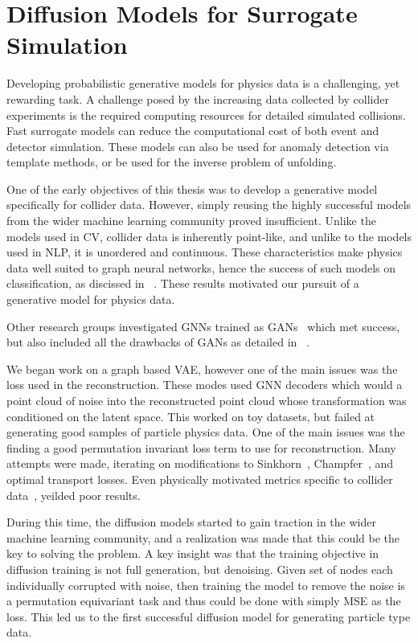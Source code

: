 \chapter{Diffusion Models for Surrogate Simulation}

Developing probabilistic generative models for physics data is a challenging, yet rewarding task.
A challenge posed by the increasing data collected by collider experiments is the required computing resources for detailed simulated collisions.
Fast surrogate models can reduce the computational cost of both event and detector simulation.
These models can also be used for anomaly detection via template methods, or be used for the inverse problem of unfolding.

One of the early objectives of this thesis was to develop a generative model specifically for collider data.
However, simply reusing the highly successful models from the wider machine learning community proved insufficient.
Unlike the models used in CV, collider data is inherently point-like, and unlike to the models used in NLP, it is unordered and continuous.
These characteristics make physics data well suited to graph neural networks, hence the success of such models on classification, as discissed in ~.
These results motivated our pursuit of a generative model for physics data.


Other research groups investigated GNNs trained as GANs~\cite{MPGAN} which met success, but also included all the drawbacks of GANs as detailed in ~.

We began work on a graph based VAE, however one of the main issues was the loss used in the reconstruction.
These modes used GNN decoders which would a point cloud of noise into the reconstructed point cloud whose transformation was conditioned on the latent space.
This worked on toy datasets, but failed at generating good samples of particle physics data.
One of the main issues was the finding a good permutation invariant loss term to use for reconstruction.
Many attempts were made, iterating on modifications to Sinkhorn~\cite{Sinkhorn}, Champfer~\cite{Chamfer}, and optimal transport losses.
Even physically motivated metrics specific to collider data~\cite{MetricOfCollider}, yeilded poor results.

During this time, the diffusion models started to gain traction in the wider machine learning community, and a realization was made that this could be the key to solving the problem.
A key insight was that the training objective in diffusion training is not full generation, but denoising.
Given set of nodes each individually corrupted with noise, then training the model to remove the noise is a permutation equivariant task and thus could be done with simply MSE as the loss.
This led us to the first successful diffusion model for generating particle type data.

